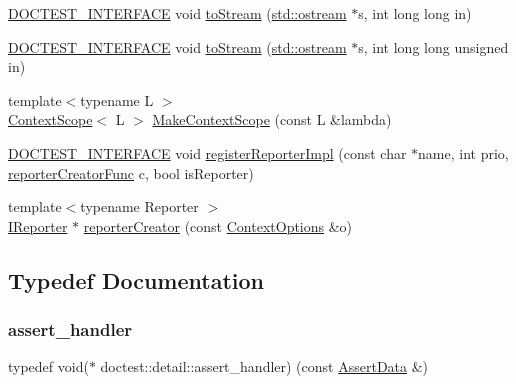 \begin{DoxyCompactItemize}
\mbox{\hyperlink{doctest_8h_a9c16ffc635ec47f07797d21ede26b1a5}{D\+O\+C\+T\+E\+S\+T\+\_\+\+I\+N\+T\+E\+R\+F\+A\+CE}} void \mbox{\hyperlink{namespacedoctest_1_1detail_a359e9b95a3fbe0322056d9d9c7385cde}{to\+Stream}} (\mbox{\hyperlink{doctest_8h_a116af65cb5e924b33ad9d9ecd7a783f3}{std\+::ostream}} $\ast$s, int long long in)
\item 
\mbox{\hyperlink{doctest_8h_a9c16ffc635ec47f07797d21ede26b1a5}{D\+O\+C\+T\+E\+S\+T\+\_\+\+I\+N\+T\+E\+R\+F\+A\+CE}} void \mbox{\hyperlink{namespacedoctest_1_1detail_a22df719818a3df2b975ba0f7045cc8fd}{to\+Stream}} (\mbox{\hyperlink{doctest_8h_a116af65cb5e924b33ad9d9ecd7a783f3}{std\+::ostream}} $\ast$s, int long long unsigned in)
\item 
{\footnotesize template$<$typename L $>$ }\\\mbox{\hyperlink{classdoctest_1_1detail_1_1_context_scope}{Context\+Scope}}$<$ L $>$ \mbox{\hyperlink{namespacedoctest_1_1detail_a193493f40330f096b9e1b78557a832a3}{Make\+Context\+Scope}} (const L \&lambda)
\item 
\mbox{\hyperlink{doctest_8h_a9c16ffc635ec47f07797d21ede26b1a5}{D\+O\+C\+T\+E\+S\+T\+\_\+\+I\+N\+T\+E\+R\+F\+A\+CE}} void \mbox{\hyperlink{namespacedoctest_1_1detail_a828e011bb6028ab94eb14a3c7d8bd2c4}{register\+Reporter\+Impl}} (const char $\ast$name, int prio, \mbox{\hyperlink{namespacedoctest_1_1detail_a030c0c44c25bdebe6a83858d1f454f72}{reporter\+Creator\+Func}} c, bool is\+Reporter)
\item 
{\footnotesize template$<$typename Reporter $>$ }\\\mbox{\hyperlink{structdoctest_1_1_i_reporter}{I\+Reporter}} $\ast$ \mbox{\hyperlink{namespacedoctest_1_1detail_a575cd92f018bfe3c702432a2144ebaca}{reporter\+Creator}} (const \mbox{\hyperlink{structdoctest_1_1_context_options}{Context\+Options}} \&o)
\end{DoxyCompactItemize}


\subsection{Typedef Documentation}
\mbox{\label{namespacedoctest_1_1detail_a5b5db6997f20389de5735e3ee3439b95}} 
\subsubsection{\texorpdfstring{assert\+\_\+handler}{assert\_handler}}
{\footnotesize\ttfamily typedef void($\ast$ doctest\+::detail\+::assert\+\_\+handler) (const \mbox{\hyperlink{structdoctest_1_1_assert_data}{Assert\+Data}} \&)}

